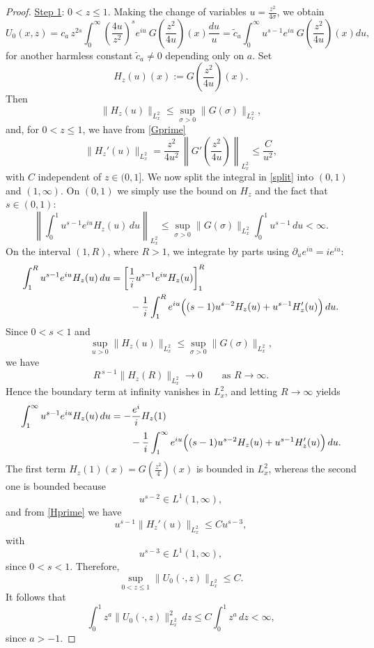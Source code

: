 \documentclass[10pt,a4paper]{amsart}
\begin{document}
\begin{proof}
\medskip
\noindent \underline{Step 1}: $0<z\le 1$.
Making the change of variables
$u=\frac{z^2}{4\sigma}$,
we obtain
\begin{equation}\label{split}
U_0(x,z)
=
c_a\,z^{2s} \int_0^\infty \left(\frac{4u}{z^2}\right)^s e^{iu}\  
G\left(\frac{z^2}{4u}\right)(x) \frac{du}{u} = \tilde c_a \int_0^\infty u^{s-1} e^{iu}\ G\left(\frac{z^2}{4u}\right)(x) du,
\end{equation}
for another harmless constant $\widetilde c_a\neq 0$ depending only on $a$.
Set
\[
H_z(u)(x):=G\!\left(\frac{z^2}{4u}\right)(x).
\]
Then
\[
\|H_z(u)\|_{L^2_x}\le \sup_{\sigma>0}\|G(\sigma)\|_{L^2_x},
\]
and, for $0<z\le 1$, we have from \eqref{Gprime}
\begin{equation}\label{Hprime}
\|H_z'(u)\|_{L^2_x}
=
\frac{z^2}{4u^2}\,
\left\|G'\!\left(\frac{z^2}{4u}\right)\right\|_{L^2_x}
\le \frac{C}{u^2},
\end{equation}
with $C$ independent of $z\in(0,1]$.
We now split the integral in \eqref{split} into $(0,1)$ and $(1,\infty)$.
On $(0,1)$ we simply use the bound on $H_z$ and the fact that $s\in(0,1)$:
\[
\left\|\int_0^1 u^{s-1}e^{iu}H_z(u)\,du\right\|_{L^2_x}
\le
\sup_{\sigma>0}\|G(\sigma)\|_{L^2_x}\int_0^1 u^{s-1}\,du
<\infty.
\]
On the interval $(1,R)$, where $R>1$, we integrate by parts using
$\partial_u e^{iu}=ie^{iu}$:
\[
\begin{aligned}
\int_1^R u^{s-1}e^{iu}H_z(u)\,du
&=
\left[\frac{1}{i}u^{s-1}e^{iu}H_z(u)\right]_1^R  \\
&\qquad
-\frac1i
\int_1^R
e^{iu}
\Bigl((s-1)u^{s-2}H_z(u)
+
u^{s-1}H_z'(u)
\Bigr)\,du .
\end{aligned}
\]
Since $0<s<1$ and
\[
\sup_{u>0}\|H_z(u)\|_{L^2_x}
\le
\sup_{\sigma>0}\|G(\sigma)\|_{L^2_x},
\]
we have
\[
R^{\,s-1}\|H_z(R)\|_{L^2_x}
\longrightarrow0
\qquad\text{as }R\to\infty.
\]
Hence the boundary term at infinity vanishes in $L^2_x$, and letting
$R\to\infty$ yields
\[
\begin{aligned}
\int_1^\infty u^{s-1}e^{iu}H_z(u)\,du
&=
-\frac{e^{i}}{i}H_z(1)
\\
&\qquad
-\frac1i
\int_1^\infty
e^{iu}
\Bigl((s-1)u^{s-2}H_z(u)
+
u^{s-1}H_z'(u)
\Bigr)\,du .
\end{aligned}
\]
The first term $H_z(1)(x) = G\!\left(\frac{z^2}{4}\right)(x)$ is bounded in $L^2_x$, whereas the second one is bounded
because
\[
u^{s-2}\in L^1(1,\infty),
\]
and from \eqref{Hprime} we have
\[
u^{s-1}\|H_z'(u)\|_{L^2_x}
\le
Cu^{s-3},
\]
with
\[
u^{s-3}\in L^1(1,\infty),
\]
since $0<s<1$.
Therefore,
\[
\sup_{0<z\le 1}\|U_0(\cdot,z)\|_{L^2_x}\le C.
\]
It follows that
\[
\int_0^1 z^a\|U_0(\cdot,z)\|_{L^2_x}^2\,dz
\le
C\int_0^1 z^a\,dz<\infty,
\]
since $a>-1$.


\end{proof}
\end{document}
